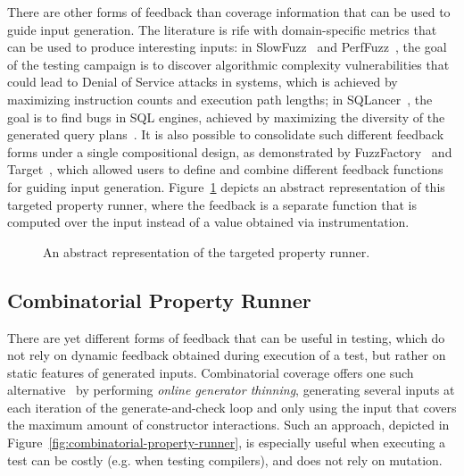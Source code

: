 There are other forms of feedback than coverage information that can be used to guide
input generation. The literature is rife with domain-specific metrics that can be used
to produce interesting inputs:
%
in SlowFuzz~\cite{SlowFuzz} and PerfFuzz~\cite{PerfFuzz}, the goal of the testing
campaign is to discover algorithmic complexity vulnerabilities that could lead to
Denial of Service attacks in systems, which is achieved by maximizing instruction
counts and execution path lengths;
%
in SQLancer~\cite{SQLancer}, the goal is to find bugs in SQL engines, achieved by
maximizing the diversity of the generated query plans~\cite{RiggerQPG23}.
%
It is also possible to consolidate such different feedback forms under a single
compositional design, as demonstrated by FuzzFactory~\cite{FuzzFactory} and
Target~\cite{TargetedPBT}, which allowed users to define and combine different feedback
functions for guiding input generation.
%
Figure~\ref{fig:targeted-property-runner} depicts an abstract representation of this
targeted property runner, where the feedback is a separate function that is computed
over the input instead of a value obtained via instrumentation.
%

\begin{figure}[h!]
  \centering
  \resizebox{0.95\linewidth}{!}{}
  \caption{An abstract representation of the targeted property runner.}
  \label{fig:targeted-property-runner}
\end{figure}

\subsection{Combinatorial Property Runner}\label{sec:loops:cpr}

There are yet different forms of feedback that can be useful in testing, which do not
rely on dynamic feedback obtained during execution of a test, but rather on static
features of generated inputs. Combinatorial coverage offers one such
alternative~\cite{CombinatorialPBT,CombinatorialEnum} by performing \emph{online
  generator thinning}, generating several inputs at each iteration of the
generate-and-check loop and only using the input that covers the maximum amount of
constructor interactions.
%
Such an approach, depicted in Figure~\ref{fig:combinatorial-property-runner}, is
especially useful when executing a test can be costly (e.g. when testing compilers),
and does not rely on mutation.

